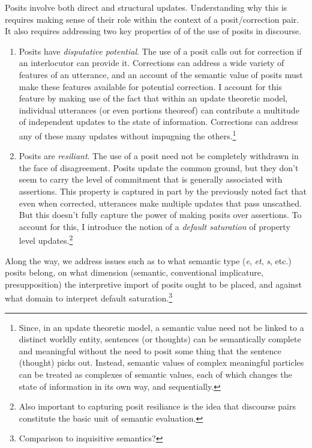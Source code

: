 \documentclass[letterpaper,]{article}
\begin{document}
Posits involve both direct and structural updates. Understanding why
this is requires making sense of their role within the context of a
posit/correction pair. It also requires addressing two key properties of
of the use of posits in discourse.

\begin{enumerate}
\def\labelenumi{\arabic{enumi}.}
\item
  Posits have \emph{disputative potential}. The use of a posit calls out
  for correction if an interlocutor can provide it. Corrections can
  address a wide variety of features of an utterance, and an account of
  the semantic value of posits must make these features available for
  potential correction. I account for this feature by making use of the
  fact that within an update theoretic model, individual utterances (or
  even portions theoreof) can contribute a multitude of independent
  updates to the state of information. Corrections can address any of
  these many updates without impugning the others.\footnote{Since, in an
    update theoretic model, a semantic value need not be linked to a
    distinct worldly entity, sentences (or thoughts) can be semantically
    complete and meaningful without the need to posit some thing that
    the sentence (thought) picks out. Instead, semantic values of
    complex meaningful particles can be treated as complexes of semantic
    values, each of which changes the state of information in its own
    way, and sequentially.}
\item
  Posits are \emph{resiliant}. The use of a posit need not be completely
  withdrawn in the face of disagreement. Posits update the common
  ground, but they don't seem to carry the level of commitment that is
  generally associated with assertions. This property is captured in
  part by the previously noted fact that even when corrected, utterances
  make multiple updates that pass unscathed. But this doesn't fully
  capture the power of making posits over assertions. To account for
  this, I introduce the notion of a \emph{default saturation} of
  property level updates.\footnote{Also important to capturing posit
    resiliance is the idea that discourse pairs constitute the basic
    unit of semantic evaluation.}
\end{enumerate}

Along the way, we address issues such as to what semantic type
(\emph{e}, \emph{et}, \emph{s}, etc.) posits belong, on what dimension
(semantic, conventional implicature, presupposition) the interpretive
import of posits ought to be placed, and against what domain to
interpret default saturation.\footnote{Comparison to inquisitive
  semantics?}
\end{document}
